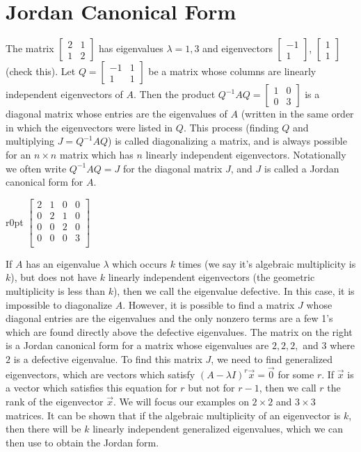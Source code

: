 \section{Jordan Canonical Form}
The matrix $\begin{bmatrix} 2&1\\1&2\end{bmatrix} $ has eigenvalues $\lambda=1,3$ and eigenvectors $\begin{bmatrix} -1\\1\end{bmatrix} $, $\begin{bmatrix} 1\\1\end{bmatrix} $ (check this). Let $Q = \begin {bmatrix} -1&1\\1&1\end {bmatrix} $ be a matrix whose columns are linearly independent eigenvectors of $A$.  Then the product $Q^{-1}AQ = \begin {bmatrix} 1&0\\0&3\end {bmatrix}$ is a diagonal matrix whose entries are the eigenvalues of $A$ (written in the same order in which the eigenvectors were listed in $Q$.  This process (finding $Q$ and multiplying $J=Q^{-1}AQ$) is called diagonalizing a matrix, and is always possible for an $n\times n$ matrix which has $n$ linearly independent eigenvectors. Notationally we often write $Q^{-1}AQ=J$ for the diagonal matrix $J$, and $J$ is called a Jordan canonical form for $A$.  

\begin{wraptable}{r}{0pt}
$\begin{bmatrix}
2&1&0&0\\
0&2&1&0\\
0&0&2&0\\
0&0&0&3\\
\end{bmatrix}$
\end{wraptable}
If $A$ has an eigenvalue $\lambda$ which occurs $k$ times (we say it's algebraic multiplicity is $k$), but does not have $k$ linearly independent eigenvectors (the geometric multiplicity is less than $k$), then we call the eigenvalue defective. In this case, it is impossible to diagonalize $A$. However, it is possible to find a matrix $J$ whose diagonal entries are the eigenvalues and the only nonzero terms are a few 1's which are found directly above the defective eigenvalues. The matrix on the right 
 is a Jordan canonical form for a matrix whose eigenvalues are $2,2,2,$ and $3$ where $2$ is a defective eigenvalue. To find this matrix $J$, we need to find generalized eigenvectors, which are vectors which satisfy $(A-\lambda I)^r\vec x=\vec 0$ for some $r$.  If $\vec x$ is a vector which satisfies this equation for $r$ but not for $r-1$, then we call $r$ the rank of the eigenvector $\vec x$. We will focus our examples on $2\times 2$ and $3\times 3$ matrices. It can be shown that if the algebraic multiplicity of an eigenvector is $k$, then there will be $k$ linearly independent generalized eigenvalues, which we can then use to obtain the Jordan form.


